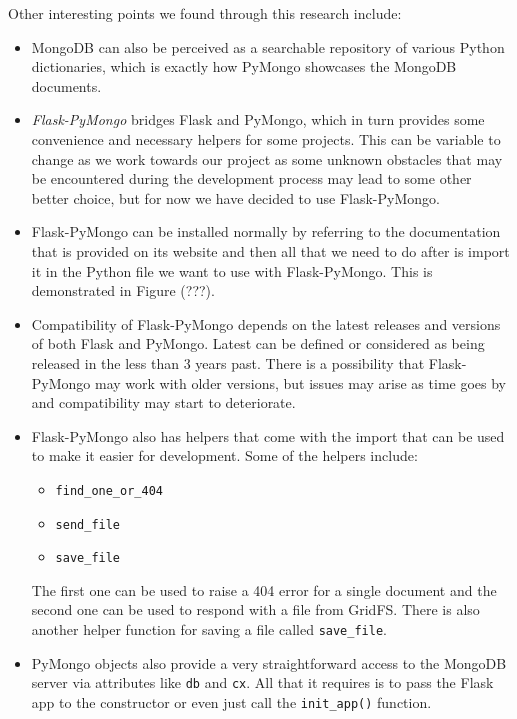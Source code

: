 \documentclass[titlepage, 12pt]{article}
\begin{document}
Other interesting points we found through this research include:

\begin{itemize}
    \item MongoDB can also be perceived as a searchable repository of various Python dictionaries, which is exactly how PyMongo showcases the MongoDB documents.
    \item \emph{Flask-PyMongo} bridges Flask and PyMongo, which in turn provides some convenience and necessary helpers for some projects. This can be variable to change as we work towards our project as some unknown obstacles that may be encountered during the development process may lead to some other better choice, but for now we have decided to use Flask-PyMongo.
    \item Flask-PyMongo can be installed normally by referring to the documentation that is provided on its website and then all that we need to do after is import it in the Python file we want to use with Flask-PyMongo. This is demonstrated in Figure (???).
    \item Compatibility of Flask-PyMongo depends on the latest releases and versions of both Flask and PyMongo. Latest can be defined or considered as being released in the less than 3 years past. There is a possibility that Flask-PyMongo may work with older versions, but issues may arise as time goes by and compatibility may start to deteriorate.
    \item Flask-PyMongo also has helpers that come with the import that can be used to make it easier for development. Some of the helpers include:
    
    \begin{itemize}
        \item \texttt{find\_one\_or\_404}
        \item \texttt{send\_file}
        \item \texttt{save\_file}
    \end{itemize}
    
    The first one can be used to raise a 404 error for a single document and the second one can be used to respond with a file from GridFS. There is also another helper function for saving a file called \texttt{save\_file}.
    \item PyMongo objects also provide a very straightforward access to the MongoDB server via attributes like \texttt{db} and \texttt{cx}. All that it requires is to pass the Flask app to the constructor or even just call the \texttt{init\_app()} function.

\end{itemize}
\end{document}
